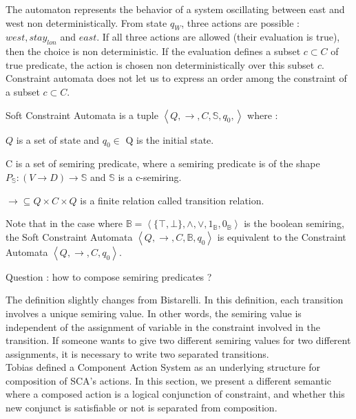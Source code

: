 The automaton represents the behavior of a system oscillating between east and west non deterministically. From state $q_W$, three actions are possible : $west, stay_{lon} $ and $east$. If all three actions are allowed (their evaluation is true), then the choice is non deterministic. If the evaluation defines a subset $c \subset C$ of true predicate, the action is chosen non deterministically over this subset $c$. Constraint automata does not let us to express an order among the constraint of a subset $c \subset C$.
\begin{definition}
	Soft Constraint Automata is a tuple $\left\langle Q, \rightarrow, C, \mathbb{S}, q_{0}, \right\rangle$ where : 
	\begin{list}{-}{ }
		\item $Q$ is a set of state and $q_0\in$ Q is the initial state.
		\item C is a set of semiring predicate, where a semiring predicate is of the shape $P_{\mathbb{S}} : (V \rightarrow D) \rightarrow \mathbb{S} $ and $\mathbb{S}$ is a c-semiring.
		\item $\rightarrow \subseteq Q \times C \times Q$ is a finite relation called transition relation. 
	\end{list}
\end{definition}

Note that in the case where $\mathbb{B} = \left \langle \{\top,\bot\}, \land, \lor, 1_{\mathbb{B}}, 0_{\mathbb{B}} \right \rangle$ is the boolean semiring, the Soft Constraint Automata $\left\langle Q, \rightarrow, C, \mathbb{B}, q_{0} \right\rangle$ is equivalent to the Constraint Automata $\left\langle Q, \rightarrow, C, q_{0}\right\rangle$.

Question : how to compose semiring predicates ?

The definition slightly changes from Bistarelli. In this definition, each transition involves a unique semiring value. In other words, the semiring value is independent of the assignment of variable in the constraint involved in the transition. If someone wants to give two different semiring values for two different assignments, it is necessary to write two separated transitions.\\
Tobias defined a Component Action System as an underlying structure for composition of SCA's actions. In this section, we present a different semantic where a composed action is a logical conjunction of constraint, and whether this new conjunct is satisfiable or not is separated from composition.

